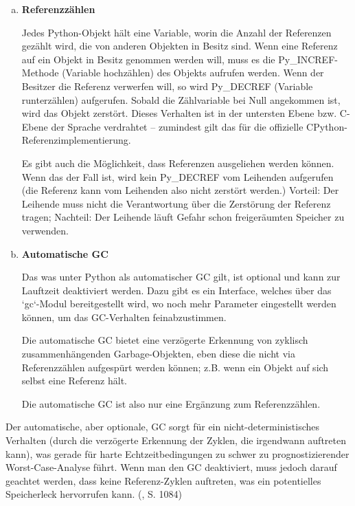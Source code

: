 \begin{enumerate}[(a)]

  \item \textbf{Referenzzählen}

        Jedes Python-Objekt hält eine Variable, worin die Anzahl der
        Referenzen gezählt wird, die von anderen Objekten in Besitz sind.
        Wenn eine Referenz auf ein Objekt in Besitz genommen werden will,
        muss es die Py\_INCREF-Methode (Variable hochzählen) des Objekts
        aufrufen werden. Wenn der Besitzer die Referenz verwerfen will, so
        wird Py\_DECREF (Variable runterzählen) aufgerufen. Sobald die
        Zählvariable bei Null angekommen ist, wird das Objekt zerstört.
        Dieses Verhalten ist in der untersten Ebene bzw. C-Ebene der Sprache
        verdrahtet -- zumindest gilt das für die offizielle
        CPython-Referenzimplementierung.

        Es gibt auch die Möglichkeit, dass Referenzen ausgeliehen werden
        können. Wenn das der Fall ist, wird kein Py\_DECREF vom Leihenden
        aufgerufen (die Referenz kann vom Leihenden also nicht zerstört
        werden.) Vorteil: Der Leihende muss nicht die Verantwortung über die
        Zerstörung der Referenz tragen; Nachteil: Der Leihende läuft Gefahr
        schon freigeräumten Speicher zu verwenden.

  \item \textbf{Automatische GC}

        Das was unter Python als automatischer GC gilt, ist optional und
        kann zur Lauftzeit deaktiviert werden. Dazu gibt es ein Interface,
        welches über das `gc`-Modul bereitgestellt wird, wo noch mehr
        Parameter eingestellt werden können, um das GC-Verhalten
        feinabzustimmen.

        Die automatische GC bietet eine verzögerte Erkennung von zyklisch
        zusammenhängenden Garbage-Objekten, eben diese die nicht via
        Referenzzählen aufgespürt werden können; z.B. wenn ein Objekt auf
        sich selbst eine Referenz hält.

        Die automatische GC ist also nur eine Ergänzung zum Referenzzählen.

\end{enumerate}


Der automatische, aber optionale, GC sorgt für ein nicht-deterministisches
Verhalten (durch die verzögerte Erkennung der Zyklen, die irgendwann
auftreten kann), was gerade für harte Echtzeitbedingungen zu schwer zu
prognostizierender Worst-Case-Analyse führt. Wenn man den GC deaktiviert,
muss jedoch darauf geachtet werden, dass keine Referenz-Zyklen auftreten,
was ein potentielles Speicherleck hervorrufen kann. (\cite{pyref-library}, S. 1084)


